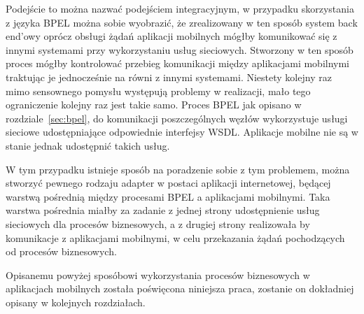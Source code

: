 Podejście to można nazwać podejściem integracyjnym, w przypadku skorzystania z języka BPEL można sobie wyobrazić, że zrealizowany w ten sposób system back end'owy oprócz obsługi żądań aplikacji mobilnych mógłby komunikować się z innymi systemami przy wykorzystaniu usług sieciowych. Stworzony w ten sposób proces mógłby kontrolować przebieg komunikacji między aplikacjami mobilnymi traktując je jednocześnie na równi z innymi systemami.  Niestety kolejny raz mimo sensownego pomysłu występują problemy w realizacji, mało tego ograniczenie kolejny raz jest takie samo. Proces BPEL jak opisano w rozdziale~\ref{sec:bpel}, do komunikacji poszczególnych węzłów wykorzystuje usługi sieciowe udostępniające odpowiednie interfejsy WSDL. Aplikacje mobilne nie są w stanie jednak udostępnić takich usług. 

W tym przypadku istnieje sposób na poradzenie sobie z tym problemem, można stworzyć pewnego rodzaju adapter w postaci aplikacji internetowej, będącej warstwą pośrednią między procesami BPEL a aplikacjami mobilnymi. Taka warstwa pośrednia miałby za zadanie z jednej strony udostępnienie usług sieciowych dla procesów biznesowych, a z drugiej strony realizowała by komunikacje z aplikacjami mobilnymi, w celu przekazania żądań pochodzących od procesów biznesowych. 

Opisanemu powyżej sposóbowi wykorzystania procesów biznesowych w aplikacjach mobilnych została poświęcona niniejsza praca, zostanie on dokładniej opisany w kolejnych rozdziałach.

